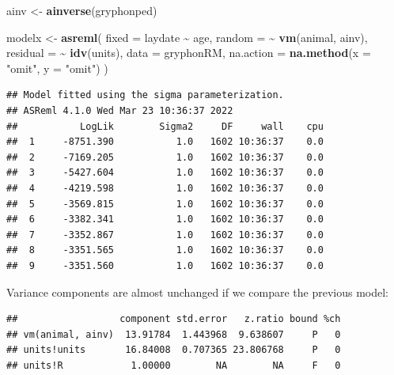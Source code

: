 \documentclass[
  12pt,
]{book}
\newenvironment{Shaded}{\begin{snugshade}}{\end{snugshade}}
\newcommand{\DataTypeTok}[1]{\textcolor[rgb]{0.13,0.29,0.53}{#1}}
\newcommand{\KeywordTok}[1]{\textcolor[rgb]{0.13,0.29,0.53}{\textbf{#1}}}
\newcommand{\NormalTok}[1]{#1}
\newcommand{\OperatorTok}[1]{\textcolor[rgb]{0.81,0.36,0.00}{\textbf{#1}}}
\newcommand{\StringTok}[1]{\textcolor[rgb]{0.31,0.60,0.02}{#1}}
\begin{document}
\begin{Shaded}
\begin{Highlighting}[]
\NormalTok{ainv \textless{}{-}}\StringTok{ }\KeywordTok{ainverse}\NormalTok{(gryphonped)}

\NormalTok{modelx \textless{}{-}}\StringTok{ }\KeywordTok{asreml}\NormalTok{(}
  \DataTypeTok{fixed =}\NormalTok{ laydate }\OperatorTok{\textasciitilde{}}\StringTok{ }\NormalTok{age,}
  \DataTypeTok{random =} \OperatorTok{\textasciitilde{}}\StringTok{ }\KeywordTok{vm}\NormalTok{(animal, ainv),}
  \DataTypeTok{residual =} \OperatorTok{\textasciitilde{}}\StringTok{ }\KeywordTok{idv}\NormalTok{(units),}
  \DataTypeTok{data =}\NormalTok{ gryphonRM,}
  \DataTypeTok{na.action =} \KeywordTok{na.method}\NormalTok{(}\DataTypeTok{x =} \StringTok{"omit"}\NormalTok{, }\DataTypeTok{y =} \StringTok{"omit"}\NormalTok{)}
\NormalTok{)}
\end{Highlighting}
\end{Shaded}

\begin{verbatim}
## Model fitted using the sigma parameterization.
## ASReml 4.1.0 Wed Mar 23 10:36:37 2022
##           LogLik        Sigma2     DF     wall    cpu
##  1     -8751.390           1.0   1602 10:36:37    0.0
##  2     -7169.205           1.0   1602 10:36:37    0.0
##  3     -5427.604           1.0   1602 10:36:37    0.0
##  4     -4219.598           1.0   1602 10:36:37    0.0
##  5     -3569.815           1.0   1602 10:36:37    0.0
##  6     -3382.341           1.0   1602 10:36:37    0.0
##  7     -3352.867           1.0   1602 10:36:37    0.0
##  8     -3351.565           1.0   1602 10:36:37    0.0
##  9     -3351.560           1.0   1602 10:36:37    0.0
\end{verbatim}

Variance components are almost unchanged if we compare the previous model:

\begin{Shaded}
\end{Shaded}

\begin{verbatim}
##                  component std.error   z.ratio bound %ch
## vm(animal, ainv)  13.91784  1.443968  9.638607     P   0
## units!units       16.84008  0.707365 23.806768     P   0
## units!R            1.00000        NA        NA     F   0
\end{verbatim}
\end{document}

